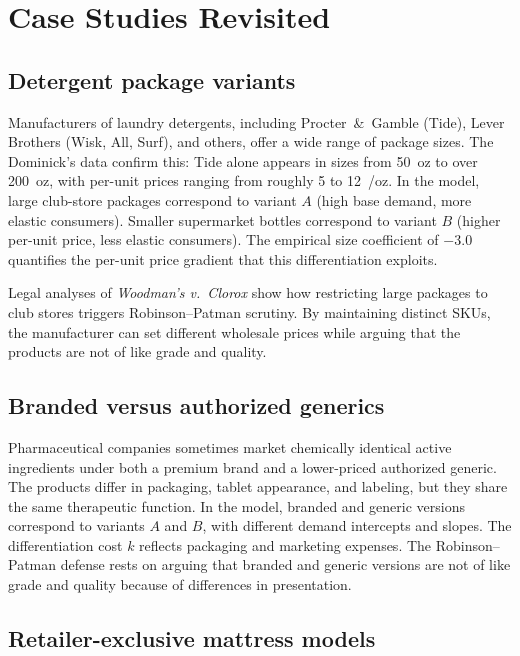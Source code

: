 \documentclass[12pt]{article}
\theoremstyle{definition}
\begin{document}
\section{Case Studies Revisited}\label{sec:cases}

\subsection{Detergent package variants}

Manufacturers of laundry detergents, including Procter~\&~Gamble (Tide), Lever Brothers (Wisk, All, Surf), and others, offer a wide range of package sizes.
The Dominick's data confirm this: Tide alone appears in sizes from 50~oz to over 200~oz, with per-unit prices ranging from roughly 5 to 12~\textcent/oz.
In the model, large club-store packages correspond to variant $A$ (high base demand, more elastic consumers). Smaller supermarket bottles correspond to variant $B$ (higher per-unit price, less elastic consumers).
The empirical size coefficient of $-3.0$ quantifies the per-unit price gradient that this differentiation exploits.

Legal analyses of \textit{Woodman's v.\ Clorox} show how restricting large packages to club stores triggers Robinson--Patman scrutiny.
By maintaining distinct SKUs, the manufacturer can set different wholesale prices while arguing that the products are not of like grade and quality.

\subsection{Branded versus authorized generics}

Pharmaceutical companies sometimes market chemically identical active ingredients under both a premium brand and a lower-priced authorized generic.
The products differ in packaging, tablet appearance, and labeling, but they share the same therapeutic function.
In the model, branded and generic versions correspond to variants $A$ and $B$, with different demand intercepts and slopes.
The differentiation cost $k$ reflects packaging and marketing expenses. The Robinson--Patman defense rests on arguing that branded and generic versions are not of like grade and quality because of differences in presentation.

\subsection{Retailer-exclusive mattress models}
\end{document}
